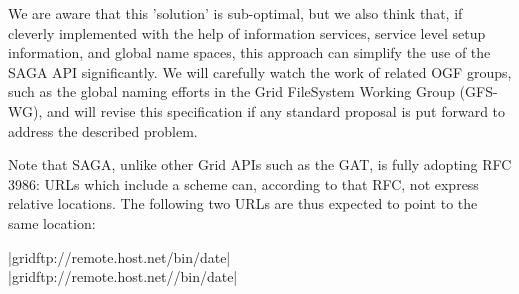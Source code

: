 
  We are aware that this 'solution' is sub-optimal, but we also
  think that, if cleverly implemented with the help of
  information services, service level setup information, and
  global name spaces, this approach can simplify the use of the
  SAGA API significantly.  We will carefully watch the work of
  related OGF groups, such as the global naming efforts in the
  Grid FileSystem Working Group (GFS-WG), and will revise this
  specification if any standard proposal is put forward to
  address the described problem.



  Note that SAGA, unlike other Grid APIs such as the
  GAT\cite{gat}, is fully adopting RFC 3986\cite{rfc-3986}: URLs
  which include a scheme can, according to that RFC, not express
  relative locations.  The following two URLs are thus expected
  to point to the same location:

  \shift |gridftp://remote.host.net/bin/date|\\
  \shift |gridftp://remote.host.net//bin/date|



